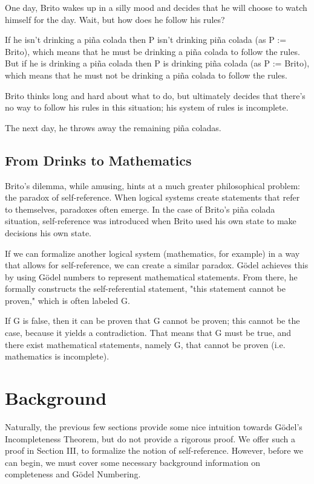 \documentclass[conference]{IEEEtran}
\begin{document}
One day, Brito wakes up in a silly mood and decides that he will choose to watch himself for the day. Wait, but how does he follow his rules?

If he isn't drinking a piña colada then P isn't drinking piña colada (as P := Brito), which means that he must be drinking a piña colada to follow the rules. But if he is drinking a piña colada then P is drinking piña colada (as P := Brito), which means that he must not be drinking a piña colada to follow the rules.

Brito thinks long and hard about what to do, but ultimately decides that there's no way to follow his rules in this situation; his system of rules is incomplete.

The next day, he throws away the remaining piña coladas.

\subsection{From Drinks to Mathematics}
Brito's dilemma, while amusing, hints at a much greater philosophical problem: the paradox of self-reference. When logical systems create statements that refer to themselves, paradoxes often emerge. In the case of Brito's piña colada situation, self-reference was introduced when Brito used his own state to make decisions his own state. 

If we can formalize another logical system (mathematics, for example) in a way that allows for self-reference, we can create a similar paradox. Gödel achieves this by using Gödel numbers to represent mathematical statements. From there, he formally constructs the self-referential statement, "this statement cannot be proven," which is often labeled G. 

If G is false, then it can be proven that G cannot be proven; this cannot be the case, because it yields a contradiction. That means that G must be true, and there exist mathematical statements, namely G, that cannot be proven (i.e. mathematics is incomplete). 

\section{Background}
Naturally, the previous few sections provide some nice intuition towards Gödel's Incompleteness Theorem, but do not provide a rigorous proof. We offer such a proof in Section III, to formalize the notion of self-reference. However, before we can begin, we must cover some necessary background information on completeness and Gödel Numbering. 
\end{document}
